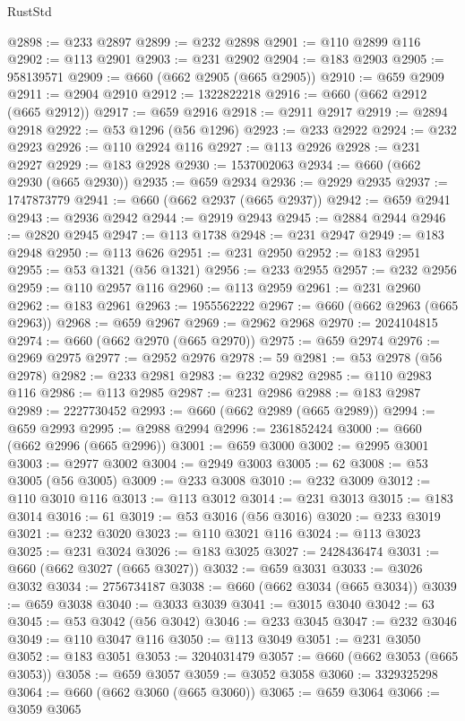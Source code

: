 \begin{lexlean}{RustStd}
\begin{coremodule}
{\begin{coremodule}
{{{{{{{{{{{{{{{{{{{{{{{{{{{{{{{{{{{{{{{{{{{{{{{@2898 := @233 @2897
@2899 := @232 @2898
@2901 := @110 @2899 @116
@2902 := @113 @2901
@2903 := @231 @2902
@2904 := @183 @2903
@2905 := 958139571
@2909 := @660 (@662 @2905 (@665 @2905))
@2910 := @659 @2909
@2911 := @2904 @2910
@2912 := 1322822218
@2916 := @660 (@662 @2912 (@665 @2912))
@2917 := @659 @2916
@2918 := @2911 @2917
@2919 := @2894 @2918
@2922 := @53 @1296 (@56 @1296)
@2923 := @233 @2922
@2924 := @232 @2923
@2926 := @110 @2924 @116
@2927 := @113 @2926
@2928 := @231 @2927
@2929 := @183 @2928
@2930 := 1537002063
@2934 := @660 (@662 @2930 (@665 @2930))
@2935 := @659 @2934
@2936 := @2929 @2935
@2937 := 1747873779
@2941 := @660 (@662 @2937 (@665 @2937))
@2942 := @659 @2941
@2943 := @2936 @2942
@2944 := @2919 @2943
@2945 := @2884 @2944
@2946 := @2820 @2945
@2947 := @113 @1738
@2948 := @231 @2947
@2949 := @183 @2948
@2950 := @113 @626
@2951 := @231 @2950
@2952 := @183 @2951
@2955 := @53 @1321 (@56 @1321)
@2956 := @233 @2955
@2957 := @232 @2956
@2959 := @110 @2957 @116
@2960 := @113 @2959
@2961 := @231 @2960
@2962 := @183 @2961
@2963 := 1955562222
@2967 := @660 (@662 @2963 (@665 @2963))
@2968 := @659 @2967
@2969 := @2962 @2968
@2970 := 2024104815
@2974 := @660 (@662 @2970 (@665 @2970))
@2975 := @659 @2974
@2976 := @2969 @2975
@2977 := @2952 @2976
@2978 := 59
@2981 := @53 @2978 (@56 @2978)
@2982 := @233 @2981
@2983 := @232 @2982
@2985 := @110 @2983 @116
@2986 := @113 @2985
@2987 := @231 @2986
@2988 := @183 @2987
@2989 := 2227730452
@2993 := @660 (@662 @2989 (@665 @2989))
@2994 := @659 @2993
@2995 := @2988 @2994
@2996 := 2361852424
@3000 := @660 (@662 @2996 (@665 @2996))
@3001 := @659 @3000
@3002 := @2995 @3001
@3003 := @2977 @3002
@3004 := @2949 @3003
@3005 := 62
@3008 := @53 @3005 (@56 @3005)
@3009 := @233 @3008
@3010 := @232 @3009
@3012 := @110 @3010 @116
@3013 := @113 @3012
@3014 := @231 @3013
@3015 := @183 @3014
@3016 := 61
@3019 := @53 @3016 (@56 @3016)
@3020 := @233 @3019
@3021 := @232 @3020
@3023 := @110 @3021 @116
@3024 := @113 @3023
@3025 := @231 @3024
@3026 := @183 @3025
@3027 := 2428436474
@3031 := @660 (@662 @3027 (@665 @3027))
@3032 := @659 @3031
@3033 := @3026 @3032
@3034 := 2756734187
@3038 := @660 (@662 @3034 (@665 @3034))
@3039 := @659 @3038
@3040 := @3033 @3039
@3041 := @3015 @3040
@3042 := 63
@3045 := @53 @3042 (@56 @3042)
@3046 := @233 @3045
@3047 := @232 @3046
@3049 := @110 @3047 @116
@3050 := @113 @3049
@3051 := @231 @3050
@3052 := @183 @3051
@3053 := 3204031479
@3057 := @660 (@662 @3053 (@665 @3053))
@3058 := @659 @3057
@3059 := @3052 @3058
@3060 := 3329325298
@3064 := @660 (@662 @3060 (@665 @3060))
@3065 := @659 @3064
@3066 := @3059 @3065
}}}}}}}}}}}}}}}}}}}}}}}}}}}}}}}}}}}}}}}}}}}}}}}
\end{coremodule}}
\end{coremodule}
\end{lexlean}
